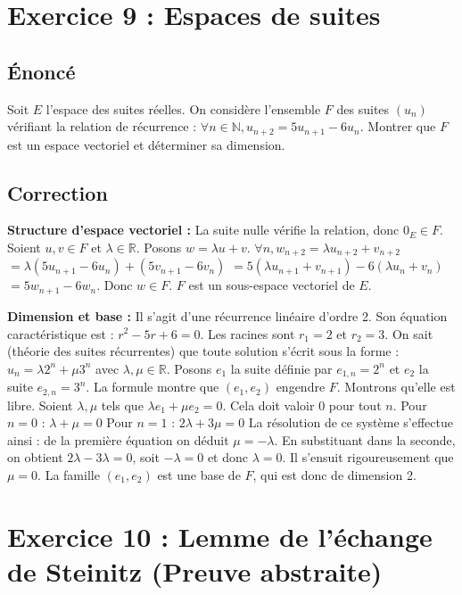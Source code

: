 \documentclass{report}
\begin{document}
\newpage


\chapter*{Exercice 9 : Espaces de suites}

\section*{Énoncé}
Soit $E$ l'espace des suites réelles. On considère l'ensemble $F$ des suites $(u_n)$ vérifiant la relation de récurrence :
$\forall n \in \mathbb{N}, u_{n+2} = 5u_{n+1} - 6u_n$.
Montrer que $F$ est un espace vectoriel et déterminer sa dimension.

\section*{Correction}
\textbf{Structure d'espace vectoriel :}
La suite nulle vérifie la relation, donc $0_E \in F$.
Soient $u, v \in F$ et $\lambda \in \mathbb{R}$. Posons $w = \lambda u + v$.
$\forall n, w_{n+2} = \lambda u_{n+2} + v_{n+2}$
$= \lambda(5u_{n+1} - 6u_n) + (5v_{n+1} - 6v_n)$
$= 5(\lambda u_{n+1} + v_{n+1}) - 6(\lambda u_n + v_n)$
$= 5w_{n+1} - 6w_n$.
Donc $w \in F$. $F$ est un sous-espace vectoriel de $E$.

\textbf{Dimension et base :}
Il s'agit d'une récurrence linéaire d'ordre 2. Son équation caractéristique est :
$r^2 - 5r + 6 = 0$.
Les racines sont $r_1 = 2$ et $r_2 = 3$.
On sait (théorie des suites récurrentes) que toute solution s'écrit sous la forme :
$u_n = \lambda 2^n + \mu 3^n$ avec $\lambda, \mu \in \mathbb{R}$.
Posons $e_1$ la suite définie par $e_{1,n} = 2^n$ et $e_2$ la suite $e_{2,n} = 3^n$.
La formule montre que $(e_1, e_2)$ engendre $F$.
Montrons qu'elle est libre. Soient $\lambda, \mu$ tels que $\lambda e_1 + \mu e_2 = 0$.
Cela doit valoir 0 pour tout $n$.
Pour $n=0$ : $\lambda + \mu = 0$
Pour $n=1$ : $2\lambda + 3\mu = 0$
La résolution de ce système s'effectue ainsi : de la première équation on déduit $\mu = -\lambda$. En substituant dans la seconde, on obtient $2\lambda - 3\lambda = 0$, soit $-\lambda = 0$ et donc $\lambda = 0$. Il s'ensuit rigoureusement que $\mu = 0$.
La famille $(e_1, e_2)$ est une base de $F$, qui est donc de dimension 2.

\newpage


\chapter*{Exercice 10 : Lemme de l'échange de Steinitz (Preuve abstraite)}
\end{document}
